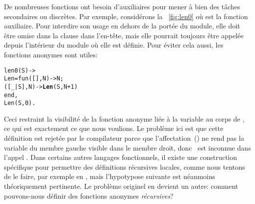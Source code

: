 De nombreuses fonctions ont besoin d'auxiliaires pour mener à bien des
tâches secondaires ou discrètes. Par exemple, considérons la
\fig~\vref{fig:len0} où  est la fonction
auxiliaire. Pour interdire son usage en dehors de la portée du module,
elle doit être omise dans la clause  dans l'en-tête,
mais elle pourrait toujours être appelée depuis l'intérieur du module
où elle est définie. Pour éviter cela aussi, les fonctions anonymes
sont utiles:
\begin{alltt}
len0(S) ->
  Len = fun(   [],N) -> N;
           ([\_|S],N) -> \textbf{Len}(S,N+1)\hfill% \emph{Ne compile pas}
        end,
  Len(S,0).
\end{alltt}
Ceci restraint la visibilité de la fonction anonyme liée à la variable
 au corps de , ce qui est exactement ce
que nous voulions. Le problème ici est que cette définition est
rejetée par le compilateur \Erlang parce que
l'affectation~(\erlcode{=}) ne rend pas la variable du membre gauche
visible dans le membre droit, donc ~est inconnue dans
l'appel . Dans certains autres langages
fonctionnels, il existe une construction spécifique pour permettre des
définitions récursives locales, comme nous tentons de le faire, par
exemple  en \OCaml, mais l'hypotypose suivante est
néanmoins théoriquement pertinente. Le problème originel en devient un
autre: comment pouvons-nous définir des fonctions anonymes
\emph{récursives}?

